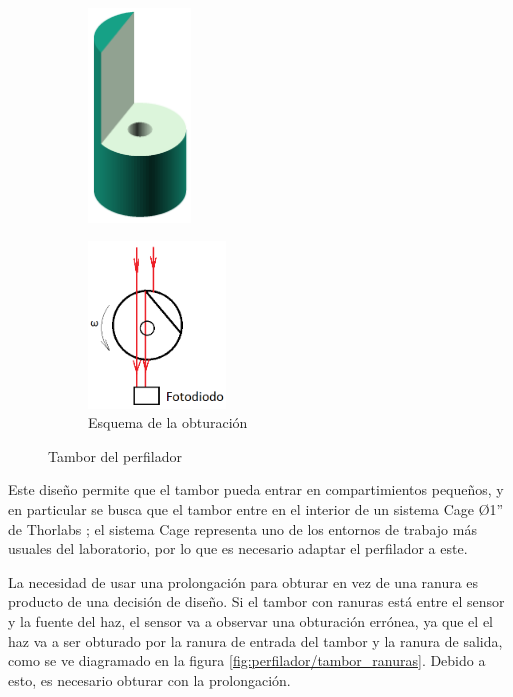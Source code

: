 \begin{figure}[H]
    \begin{subfigure}[b]{0.5\textwidth}
        \centering
        \includegraphics[width=0.3\textwidth]{fig/perfilador/tambor}
        \caption{}
        \label{fig:perfilador/tambor}
    \end{subfigure}
    \begin{subfigure}[b]{0.5\textwidth}
        \centering
        \includegraphics[width=0.4\textwidth]{fig/perfilador/corte_tambor}
        \caption{Esquema de la obturación}
        \label{fig:perfilador/corte_tambor}
    \end{subfigure}
    \caption{Tambor del perfilador}
\end{figure}

Este diseño permite que el tambor pueda entrar en compartimientos pequeños, y en particular se busca que el tambor entre en el interior de un sistema Cage Ø1'' de Thorlabs \cite{thorlabs_cage}; el sistema Cage representa uno de los entornos de trabajo más usuales del laboratorio, por lo que es necesario adaptar el perfilador a este.

La necesidad de usar una prolongación para obturar en vez de una ranura es producto de una decisión de diseño. Si el tambor con ranuras está entre el sensor y la fuente del haz, el sensor va a observar una obturación errónea, ya que el el haz va a ser obturado por la ranura de entrada del tambor y la ranura de salida, como se ve diagramado en la figura \ref{fig:perfilador/tambor_ranuras}. Debido a esto, es necesario obturar con la prolongación.

